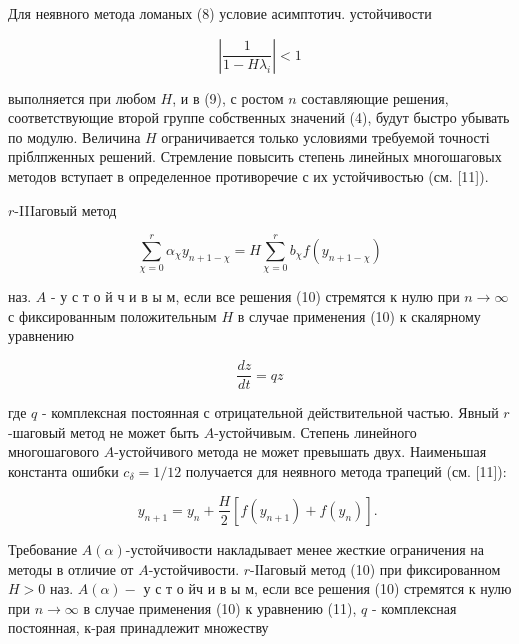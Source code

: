 \documentclass[10pt]{article}
\begin{document}
Для неявного метода ломаных (8) условие асимптотич. устойчивости



\[

\left|\frac{1}{1-H \lambda_{i}}\right|<1

\]



выполняется при любом $H$, и в (9), с ростом $n$ составляющие решения, соответствующие второй группе собственных значений (4), будут быстро убывать по модулю. Величина $H$ ограничивается только условиями требуемой точності пріблпженных решений. Стремление повысить степень линейных многошаговых методов вступает в определенное противоречие с их устойчивостью (см. [11]).



$r$-IIIаговый метод



\[

\sum_{\chi=0}^{r} \alpha_{\chi} y_{n+1-\chi}=H \sum_{\chi=0}^{r} b_{\chi} f\left(y_{n+1-\chi}\right)

\]



наз. $A$ - у с т о й ч и в ы м, если все решения (10) стремятся к нулю при $n \rightarrow \infty$ с фиксированным положительным $H$ в случае применения (10) к скалярному уравнению



\[

\frac{d z}{d t}=q z

\]



где $q$ - комплексная постоянная с отрицательной действительной частью. Явный $r$-шаговый метод не может быть $A$-устойчивым. Степень линейного многошагового $A$-устойчивого метода не может превышать двух. Наименьшая константа ошибки $c_{\delta}=1 / 12$ получается для неявного метода трапеций (см. [11]):



\[

y_{n+1}=y_{n}+\frac{H}{2}\left[f\left(y_{n+1}\right)+f\left(y_{n}\right)\right] \text {. }

\]



Требование $A(\alpha)$-устойчивости накладывает менее жесткие ограничения на методы в отличие от $A$-устойчивости. $r$-ІІаговый метод (10) при фиксированном $H>0$ наз. $A(\alpha)-$ у с т о йч и в ы м, если все решения (10) стремятся к нулю при $n \rightarrow \infty$ в случае применения (10) к уравнению (11), $q$ - комплексная постоянная, к-рая принадлежит множеству
\end{document}
